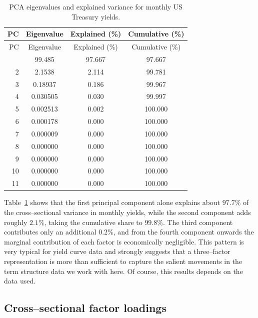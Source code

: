 \documentclass[
  letterpaper,
  DIV=11,
  numbers=noendperiod]{scrreprt}
\begin{document}
\begin{longtable}[]{@{}rccc@{}}
\caption{PCA eigenvalues and explained variance for monthly US Treasury
yields.}\label{tbl-PCA-eigenvalues}\tabularnewline
\toprule\noalign{}
PC & Eigenvalue & Explained (\%) & Cumulative (\%) \\
\midrule\noalign{}
\endfirsthead
\toprule\noalign{}
PC & Eigenvalue & Explained (\%) & Cumulative (\%) \\
\midrule\noalign{}
\endhead
\bottomrule\noalign{}
\endlastfoot
1 & 99.485 & 97.667 & 97.667 \\
2 & 2.1538 & 2.114 & 99.781 \\
3 & 0.18937 & 0.186 & 99.967 \\
4 & 0.030505 & 0.030 & 99.997 \\
5 & 0.002513 & 0.002 & 100.000 \\
6 & 0.000178 & 0.000 & 100.000 \\
7 & 0.000009 & 0.000 & 100.000 \\
8 & 0.000000 & 0.000 & 100.000 \\
9 & 0.000000 & 0.000 & 100.000 \\
10 & 0.000000 & 0.000 & 100.000 \\
11 & 0.000000 & 0.000 & 100.000 \\
\end{longtable}

Table~\ref{tbl-PCA-eigenvalues} shows that the first principal component
alone explains about \(97.7\%\) of the cross--sectional variance in
monthly yields, while the second component adds roughly \(2.1\%\),
taking the cumulative share to \(99.8\%\). The third component
contributes only an additional \(0.2\%\), and from the fourth component
onwards the marginal contribution of each factor is economically
negligible. This pattern is very typical for yield curve data and
strongly suggests that a three--factor representation is more than
sufficient to capture the salient movements in the term structure data
we work with here. Of course, this results depends on the data used.

\subsection{Cross--sectional factor
loadings}\label{crosssectional-factor-loadings}
\end{document}
